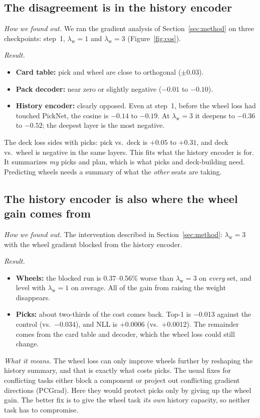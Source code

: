 \documentclass[11pt,letterpaper]{article}
\newcommand{\lw}{\lambda_{\text{w}}}
\begin{document}
\subsection{The disagreement is in the history encoder}

\textit{How we found out.} We ran the gradient analysis of Section~\ref{sec:method} on three checkpoints: step~1,
$\lw=1$ and $\lw=3$ (Figure~\ref{fig:cos}).

\textit{Result.}
\begin{itemize}
\item \textbf{Card table:} pick and wheel are close to orthogonal ($\pm0.03$).
\item \textbf{Pack decoder:} near zero or slightly negative ($-0.01$ to $-0.10$).
\item \textbf{History encoder:} clearly opposed. Even at step~1, before the wheel loss had touched PickNet, the
cosine is $-0.14$ to $-0.19$. At $\lw=3$ it deepens to $-0.36$ to $-0.52$; the deepest layer is the most
negative.
\end{itemize}
The deck loss sides with picks: pick vs.\ deck is $+0.05$ to $+0.31$, and deck vs.\ wheel is negative in the
same layers. This fits what the history encoder is for. It summarizes \emph{my} picks and plan, which is what
picks and deck-building need. Predicting wheels needs a summary of what the \emph{other} seats are taking.

\subsection{The history encoder is also where the wheel gain comes from}

\textit{How we found out.} The intervention described in Section~\ref{sec:method}: $\lw=3$ with the wheel gradient
blocked from the history encoder.

\textit{Result.}
\begin{itemize}
\item \textbf{Wheels:} the blocked run is 0.37--0.56\% worse than $\lw=3$ on \emph{every} set, and level with
$\lw=1$ on average. All of the gain from raising the weight disappears.
\item \textbf{Picks:} about two-thirds of the cost comes back. Top-1 is $-$0.013 against the control (vs.\
$-$0.034), and NLL is +0.0006 (vs.\ +0.0012). The remainder comes from the card table and decoder, which the
wheel loss could still change.
\end{itemize}

\textit{What it means.} The wheel loss can only improve wheels further by reshaping the history summary, and
that is exactly what costs picks. The usual fixes for conflicting tasks either block a component or project out
conflicting gradient directions (PCGrad). Here they would protect picks only by giving up the wheel gain. The
better fix is to give the wheel task \emph{its own} history capacity, so neither task has to compromise.
\end{document}
